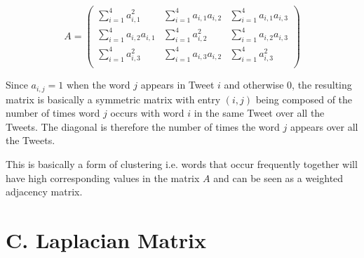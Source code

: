 \documentclass[11pt,a4paper]{article}
\begin{document}
\begin{equation}
A =
\left( \begin{matrix}
\sum_{i=1}^4 a_{i,1}^2& \sum_{i=1}^4 a_{i,1} a_{i,2} &  \sum_{i=1}^4 a_{i,1} a_{i,3} \\ 
\sum_{i=1}^4 a_{i,2}a_{i, 1} & \sum_{i=1}^4 a_{i,2}^2 &  \sum_{i=1}^4 a_{i,2} a_{i,3} \\ 
\sum_{i=1}^4 a_{i,3}^2& \sum_{i=1}^4 a_{i,3} a_{i,2} &  \sum_{i=1}^4  a_{i,3}^2 \\ 
\end{matrix} \right)
\end{equation}

Since $a_{i, j} = 1$ when the word $j$ appears in Tweet $i$ and otherwise 0, the resulting matrix is basically a symmetric matrix with entry $(i, j)$ being composed of the number of times word $j$ occurs with word $i$ in the same Tweet over all the Tweets. The diagonal is  therefore the number of times the word $j$ appears over all the Tweets.

This is basically a form of clustering i.e. words that occur frequently together will have high corresponding values in the matrix $A$ and can be seen as a weighted adjacency matrix.

\section*{C. Laplacian Matrix}
\end{document}

